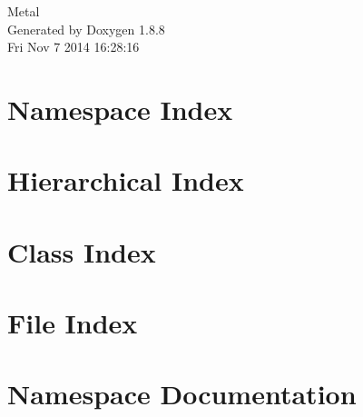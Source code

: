 \documentclass[twoside]{book}
\newcommand{\+}{\discretionary{\mbox{\scriptsize$\hookleftarrow$}}{}{}}
\newcommand{\clearemptydoublepage}{%
  \newpage{\pagestyle{empty}\cleardoublepage}%
}
\begin{document}
\hypersetup{pageanchor=false,
             bookmarks=true,
             bookmarksnumbered=true,
             pdfencoding=unicode
            }
\begin{titlepage}
\vspace*{7cm}
\begin{center}%
{\Large Metal }\\
\vspace*{1cm}
{\large Generated by Doxygen 1.8.8}\\
\vspace*{0.5cm}
{\small Fri Nov 7 2014 16:28:16}\\
\end{center}
\end{titlepage}
\clearemptydoublepage
\tableofcontents
\clearemptydoublepage
{}
\hypersetup{pageanchor=true}

\chapter{Namespace Index}

\chapter{Hierarchical Index}

\chapter{Class Index}

\chapter{File Index}

\chapter{Namespace Documentation}








\end{document}
